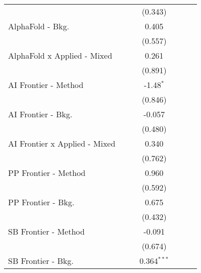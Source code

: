 \begin{tabular}{lcccccc}
                                  &             &              & (0.343)       &         &        &   \\   
   AlphaFold - Bkg.               &             &              & 0.405         &         &        &   \\   
                                  &             &              & (0.557)       &         &        &   \\   
   AlphaFold x Applied - Mixed    &             &              & 0.261         &         &        &   \\   
                                  &             &              & (0.891)       &         &        &   \\   
   AI Frontier - Method           &             &              & -1.48$^{*}$   &         &        &   \\   
                                  &             &              & (0.846)       &         &        &   \\   
   AI Frontier - Bkg.             &             &              & -0.057        &         &        &   \\   
                                  &             &              & (0.480)       &         &        &   \\   
   AI Frontier x Applied - Mixed  &             &              & 0.340         &         &        &   \\   
                                  &             &              & (0.762)       &         &        &   \\   
   PP Frontier - Method           &             &              & 0.960         &         &        &   \\   
                                  &             &              & (0.592)       &         &        &   \\   
   PP Frontier - Bkg.             &             &              & 0.675         &         &        &   \\   
                                  &             &              & (0.432)       &         &        &   \\   
   SB Frontier - Method           &             &              & -0.091        &         &        &   \\   
                                  &             &              & (0.674)       &         &        &   \\   
   SB Frontier - Bkg.             &             &              & 0.364$^{***}$ &         &        &   \\   

\end{tabular}
